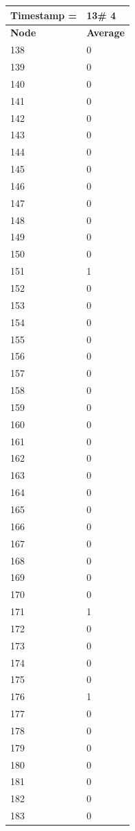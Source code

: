 \begin{tabular}{|l||l|}
\hline
\textbf{Timestamp =} & \textbf{13}\# 4\\\hline
	\textbf{Node} & \textbf{Average} \\ \hline
\hline
	138 & 0 \\ \hline
	139 & 0 \\ \hline
	140 & 0 \\ \hline
	141 & 0 \\ \hline
	142 & 0 \\ \hline
	143 & 0 \\ \hline
	144 & 0 \\ \hline
	145 & 0 \\ \hline
	146 & 0 \\ \hline
	147 & 0 \\ \hline
	148 & 0 \\ \hline
	149 & 0 \\ \hline
	150 & 0 \\ \hline
	151 & 1 \\ \hline
	152 & 0 \\ \hline
	153 & 0 \\ \hline
	154 & 0 \\ \hline
	155 & 0 \\ \hline
	156 & 0 \\ \hline
	157 & 0 \\ \hline
	158 & 0 \\ \hline
	159 & 0 \\ \hline
	160 & 0 \\ \hline
	161 & 0 \\ \hline
	162 & 0 \\ \hline
	163 & 0 \\ \hline
	164 & 0 \\ \hline
	165 & 0 \\ \hline
	166 & 0 \\ \hline
	167 & 0 \\ \hline
	168 & 0 \\ \hline
	169 & 0 \\ \hline
	170 & 0 \\ \hline
	171 & 1 \\ \hline
	172 & 0 \\ \hline
	173 & 0 \\ \hline
	174 & 0 \\ \hline
	175 & 0 \\ \hline
	176 & 1 \\ \hline
	177 & 0 \\ \hline
	178 & 0 \\ \hline
	179 & 0 \\ \hline
	180 & 0 \\ \hline
	181 & 0 \\ \hline
	182 & 0 \\ \hline
	183 & 0 \\ \hline
\end{tabular}
